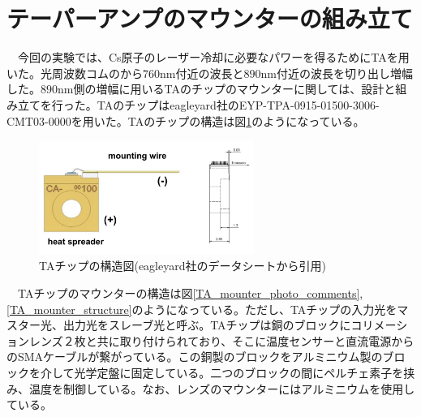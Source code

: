 \documentclass[uplatex, dvipdfmx, a4paper, report, papersize, 11pt]{jsbook}
\begin{document}
\newpage
\section{テーパーアンプのマウンターの組み立て}
　今回の実験では、Cs原子のレーザー冷却に必要なパワーを得るためにTAを用いた。光周波数コムのから$760 \mathrm{nm}$付近の波長と$890 \mathrm{nm}$付近の波長を切り出し増幅した。$890 \mathrm{nm}$側の増幅に用いるTAのチップのマウンターに関しては、設計と組み立てを行った。TAのチップはeagleyard社のEYP-TPA-0915-01500-3006-CMT03-0000を用いた。TAのチップの構造は図\ref{TA_chip_ds}のようになっている。\\
\begin{figure}[htbp]
 \begin{center}
  \includegraphics[width=70mm]{figures/chapter4/TA_chip_ds.png}
\end{center}
 \caption{TAチップの構造図(eagleyard社のデータシートから引用)}
 \label{TA_chip_ds}
\end{figure}
　TAチップのマウンターの構造は図\ref{TA_mounter_photo_comments},\ref{TA_mounter_structure}のようになっている。ただし、TAチップの入力光をマスター光、出力光をスレーブ光と呼ぶ。TAチップは銅のブロックにコリメーションレンズ２枚と共に取り付けられており、そこに温度センサーと直流電源からのSMAケーブルが繋がっている。この銅製のブロックをアルミニウム製のブロックを介して光学定盤に固定している。二つのブロックの間にペルチェ素子を挟み、温度を制御している。なお、レンズのマウンターにはアルミニウムを使用している。
\end{document}
